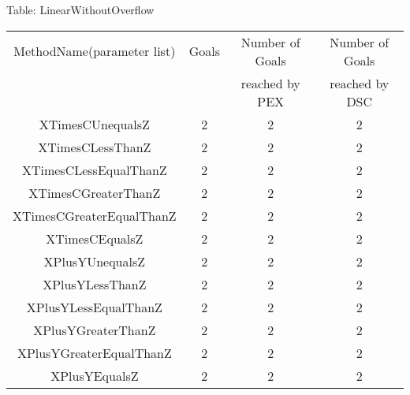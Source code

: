 \begin{table}
{Table: LinearWithoutOverflow}
\begin{center}
\begin{tabular}{c|c|c|c}
\hline



MethodName(parameter list)                             &       Goals       &  Number of Goals  &  Number of Goals       \\
                                                       &                   &  reached by PEX   &  reached by DSC        \\\hline\hline



XTimesCUnequalsZ                                       &           2       &           2       &           2             \\
XTimesCLessThanZ                                       &           2       &           2       &           2             \\
XTimesCLessEqualThanZ                                  &           2       &           2       &           2             \\
XTimesCGreaterThanZ                                    &           2       &           2       &           2             \\
XTimesCGreaterEqualThanZ                               &           2       &           2       &           2             \\
XTimesCEqualsZ                                         &           2       &           2       &           2             \\
XPlusYUnequalsZ                                        &           2       &           2       &           2             \\
XPlusYLessThanZ                                        &           2       &           2       &           2             \\
XPlusYLessEqualThanZ                                   &           2       &           2       &           2             \\
XPlusYGreaterThanZ                                     &           2       &           2       &           2             \\
XPlusYGreaterEqualThanZ                                &           2       &           2       &           2             \\
XPlusYEqualsZ                                          &           2       &           2       &           2             \\

\end{tabular}
\end{center}
\end{table}
